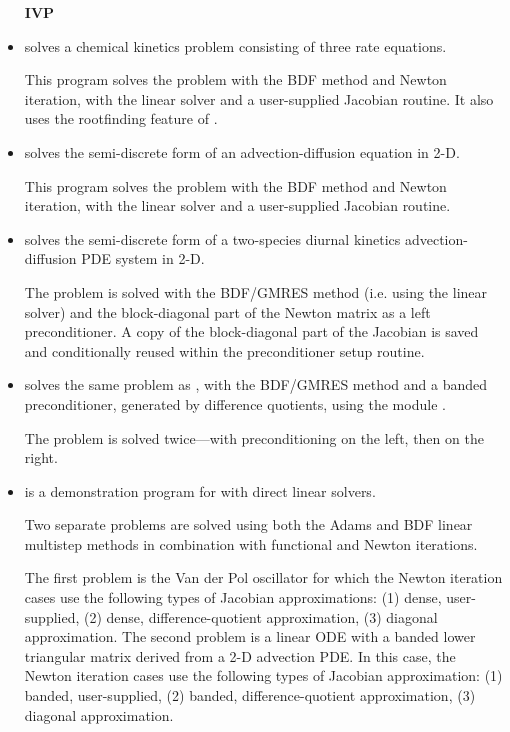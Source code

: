 \begin{itemize}

\item[{\bf IVP}]

\item {}
  solves a chemical kinetics problem consisting of three rate equations.

  This program solves the problem with the BDF method and Newton          
  iteration, with the {\cvdense} linear solver and a user-supplied    
  Jacobian routine.  It also uses the rootfinding feature of {\cvode}.

\item {}
  solves the semi-discrete form of an advection-diffusion equation in 2-D. 

  This program solves the problem with the BDF method and Newton          
  iteration, with the {\cvband} linear solver and a user-supplied     
  Jacobian routine.

\item {}
  solves the semi-discrete form of a two-species diurnal kinetics
  advection-diffusion PDE system in 2-D.

  The problem is solved with the BDF/GMRES method (i.e.    
  using the {\cvspgmr} linear solver) and the block-diagonal part of the  
  Newton matrix as a left preconditioner. A copy of the block-diagonal 
  part of the Jacobian is saved and conditionally reused within the    
  preconditioner setup routine.

\item {}
  solves the same problem as , with the BDF/GMRES method 
  and a banded preconditioner, generated by difference quotients, 
  using the module {\cvbandpre}.

  The problem is solved twice---with preconditioning on the left,
  then on the right.

\item {}
  is a demonstration program for {\cvode} with direct linear solvers.

  Two separate problems are solved using both the Adams and BDF linear
  multistep methods in combination with functional and Newton
  iterations. 

  The first problem is the Van der Pol oscillator for which 
  the Newton iteration cases use the following types of Jacobian approximations:
  (1) dense, user-supplied, (2) dense, difference-quotient approximation, 
  (3) diagonal approximation. The second problem is a linear ODE with a
  banded lower triangular matrix derived from a 2-D advection PDE. In this
  case, the Newton iteration cases use the following types of Jacobian
  approximation: (1) banded, user-supplied, (2) banded, difference-quotient
  approximation, (3) diagonal approximation.


\end{itemize}
